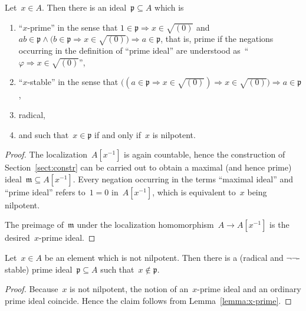 \documentclass[envcountsect,envcountsame,runningheads]{llncs}
\newcommand{\mmm}{\mathfrak{m}}
\newcommand{\ppp}{\mathfrak{p}}
\renewcommand{\_}{\mathpunct{.}\,}
\begin{document}
\begin{lemma}\label{lemma:x-prime}
Let~$x \in A$. Then there is an ideal~$\ppp \subseteq A$ which is
\begin{enumerate}
\item ``$x$-prime'' in the sense that
$1 \in \ppp \Rightarrow x \in \sqrt{(0)}$ and
$ab \in \ppp \wedge \bigl(b \in \ppp \Rightarrow x \in \sqrt{(0)}\bigr) \Longrightarrow
   a \in \ppp$,
that is, prime if the negations occurring in the definition of ``prime ideal''
are understood as~``$\varphi \Rightarrow x \in \sqrt{(0)}$'',
\item ``$x$-stable'' in the sense that
$\bigl((a \in \ppp \Rightarrow x \in \sqrt{(0)}) \Rightarrow x \in \sqrt{(0)}\bigr)
  \Rightarrow a \in \ppp$,
\item radical,
\item and such that~$x \in \ppp$ if and only if~$x$ is nilpotent.
\end{enumerate}
\end{lemma}

\begin{proof}The localization~$A[x^{-1}]$ is again countable, hence the
construction of Section~\ref{sect:constr} can be carried out to obtain a
maximal (and hence prime) ideal~$\mmm \subseteq A[x^{-1}]$. Every negation
occurring in the terms ``maximal ideal'' and ``prime ideal'' refers to~$1 = 0$
in~$A[x^{-1}]$, which is equivalent to~$x$ being nilpotent.

The preimage of~$\mmm$ under the localization homomorphism~$A \to A[x^{-1}]$ is
the desired~$x$-prime ideal.
\end{proof}

\begin{corollary}\label{cor:nilp-prime}Let~$x \in A$ be an element which is not nilpotent. Then there is a
(radical and $\neg\neg$-stable) prime ideal~$\ppp \subseteq A$ such that~$x \not\in \ppp$.
\end{corollary}

\begin{proof}Because~$x$ is not nilpotent, the notion of an~$x$-prime ideal and
an ordinary prime ideal coincide. Hence the claim follows from
Lemma~\ref{lemma:x-prime}.\end{proof}
\end{document}
